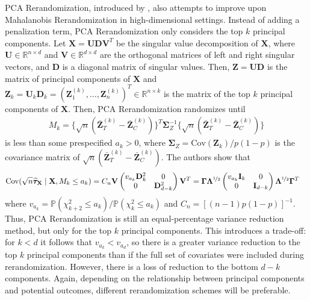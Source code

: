 \documentclass[11pt,twoside]{article}
\theoremstyle{definition}
\theoremstyle{remark}
\begin{document}
PCA Rerandomization, introduced by \cite{zhang2023pca}, also attempts to improve upon Mahalanobis Rerandomization in high-dimensional settings. Instead of adding a penalization term, PCA Rerandomization only considers the top $k$ principal components. Let $\mathbf{X} = \mathbf{UDV}^T$ be the singular value decomposition of $\mathbf{X}$, where $\mathbf{U} \in \mathbb{R}^{n \times d}$ and $\mathbf{V} \in \mathbb{R}^{d \times d}$ are the orthogonal matrices of left and right singular vectors, and $\mathbf{D}$ is a diagonal matrix of singular values. Then, $\mathbf{Z} = \mathbf{UD}$ is the matrix of principal components of $\mathbf{X}$ and $\mathbf{Z}_k = \mathbf{U}_k \mathbf{D}_k = (\mathbf{Z}^{(k)}_1, \ldots, \mathbf{Z}^{(k)}_n)^T \in \mathbb{R}^{n \times k}$ is the matrix of the top $k$ principal components of $\mathbf{X}$. Then, PCA Rerandomization randomizes until
\begin{align} \label{mk_def_pos_df}
    M_k = \big\{\sqrt{n}(\bar{\mathbf{Z}}^{(k)}_T - \bar{\mathbf{Z}}^{(k)}_C) \big\}^T \mathbf{\Sigma}^{-1}_Z \big\{\sqrt{n}(\bar{\mathbf{Z}}^{(k)}_T - \bar{\mathbf{Z}}^{(k)}_C) \big\}
\end{align}
is less than some prespecified $a_k > 0$, where $ \mathbf{\Sigma}_Z = \text{Cov}(\mathbf{Z}_k) / p(1-p)$ is the covariance matrix of $\sqrt{n}(\bar{\mathbf{Z}}_T^{(k)} - \bar{\mathbf{Z}}_C^{(k)})$. The authors show that
\begin{align*}
    \text{Cov}(\sqrt{n}\widehat{\bm{\tau}}_{\mathbf{X}} \mid \mathbf{X}, M_k \leq a_k ) &= C_n \mathbf{V} \begin{pmatrix}
        v_{a_k} \mathbf{D}^2_k & 0 \\
        0 & \mathbf{D}^2_{d - k}
    \end{pmatrix} \mathbf{V}^T = \mathbf{\Gamma} \mathbf{\Lambda}^{\nicefrac{1}{2}} \begin{pmatrix}
        v_{a_k} \mathbf{I}_k & 0 \\
        0 & \mathbf{I}_{d - k}
    \end{pmatrix} \mathbf{\Lambda}^{\nicefrac{1}{2}} \mathbf{\Gamma}^T
\end{align*}
where $v_{a_k} = \mathbb{P}(\chi^2_{k+2} \leq a_k) / \mathbb{P}(\chi^2_k \leq a_k)$ and $C_n= [(n-1)p(1-p)]^{-1}$. Thus, PCA Rerandomization is still an equal-percentage variance reduction method, but only for the top $k$ principal components. This introduces a trade-off: for $k < d$ it follows that $v_{a_k} < v_{a_d}$, so there is a greater variance reduction to the top $k$ principal components than if the full set of covariates were included during rerandomization. However, there is a loss of reduction to the bottom $d - k$ components. Again, depending on the relationship between principal components and potential outcomes, different rerandomization schemes will be preferable. 
\end{document}
